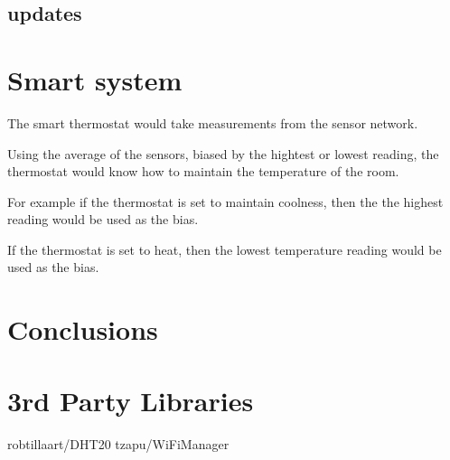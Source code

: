\documentclass[journal]{IEEEtran} %
\begin{document}
\subsection{updates}



\section{Smart system}

The smart thermostat would take measurements from the sensor network.

Using the average of the sensors, biased by the hightest or lowest reading,
the thermostat would know how to maintain the temperature of the room.

For example if the thermostat is set to maintain coolness, 
then the the highest reading would be used as the bias.

If the thermostat is set to heat,
then the lowest temperature reading would be used as the bias.


\section{Conclusions}


\section{3rd Party Libraries}
robtillaart/DHT20
tzapu/WiFiManager


\end{document}
